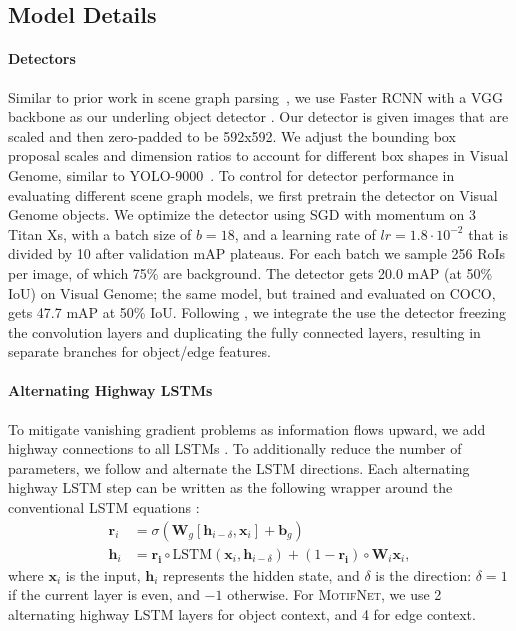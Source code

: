 \documentclass[10pt,twocolumn,letterpaper]{article}
\newcommand{\model}{\textsc{MotifNet}}
\newcommand{\vect}[1]{\mathbf{#1}}   %
\begin{document}
\subsection{Model Details}\label{subsec:setup:model_details}\paragraph{Detectors}
Similar to prior work in scene graph parsing~\cite{xu_scene_2017, li2017msdn}, we use Faster RCNN with a VGG backbone as our underling object detector \cite{ren_faster_2015,Simonyan14c}. Our detector is given images that are scaled and then zero-padded to be 592x592. We adjust the bounding box proposal scales and dimension ratios to account for different box shapes in Visual Genome, similar to YOLO-9000~\cite{redmon_yolo9000:_2016}. To control for detector performance in evaluating different scene graph models, we first pretrain the detector on Visual Genome objects. We optimize the detector using SGD with momentum on 3 Titan Xs, with a batch size of $b=18$, and a learning rate of $lr=1.8\cdot 10^{-2}$ that is divided by 10 after validation mAP plateaus.
For each batch we sample 256 RoIs per image, of which 75\% are background. The detector gets 20.0 mAP (at 50\% IoU) on Visual Genome; the same model, but trained and evaluated on COCO, gets 47.7 mAP at 50\% IoU. Following \cite{xu_scene_2017}, we integrate the use the detector freezing the convolution layers and duplicating the fully connected layers, resulting in separate branches for object/edge features.
\paragraph{Alternating Highway LSTMs}
To mitigate vanishing gradient problems as information flows upward, we add highway connections to all LSTMs \cite{he2017deep, Srivastava:2015:TVD:2969442.2969505, zhang_highway_lstm}. %
To additionally reduce the number of parameters, we follow \cite{he2017deep} and alternate the LSTM directions. Each alternating highway LSTM step can be written as the following wrapper around the conventional LSTM equations \cite{Hochreiter:1997:LSM:1246443.1246450}:
\begin{align}
\mathbf{r}_i &= \sigma(\mathbf{W}_g[\mathbf{h}_{i-\delta}, \mathbf{x}_i] + \mathbf{b}_g) \\
\mathbf{h}_i &= \mathbf{r_i} \circ \text{LSTM}(\mathbf{x}_i, \mathbf{h}_{i-\delta}) + (1-\mathbf{r_i}) \circ \mathbf{W}_i\mathbf{x}_i,
\end{align}
where $\mathbf{x}_i$ is the input, $\mathbf{h}_i$ represents the hidden state, and $\delta$ is the direction: $\delta=1$ if the current layer is even, and $-1$ otherwise. For \model, we use 2 alternating highway LSTM layers for object context, and 4 for edge context.
\end{document}
